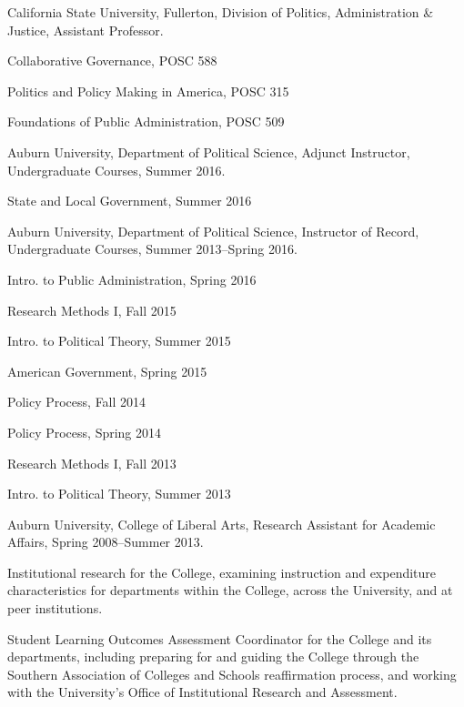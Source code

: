 \documentclass[11pt,letterpaper]{article}
\renewenvironment{itemize}{
  \begin{list}{}{
    \setlength{\leftmargin}{1.5em}
    \setlength{\itemsep}{0.25em}
    \setlength{\parskip}{0pt}
    \setlength{\parsep}{0.25em}
  }
}{
  \end{list}
}
\begin{document}
\begin{itemize}\leftmargin=2pt\itemindent=-15pt
	
\item California State University, Fullerton, Division of Politics, Administration \& Justice, Assistant Professor.
	\begin{itemize}
		\item Collaborative Governance, POSC 588
		\item Politics and Policy Making in America, POSC 315
		\item Foundations of Public Administration, POSC 509
	\end{itemize}
	
\item Auburn University, Department of Political Science, Adjunct Instructor, Undergraduate Courses, Summer 2016.
	\begin{itemize}\leftmargin=2pt\itemindent=-15pt
		\item State and Local Government, Summer 2016
	\end{itemize}
	
\item Auburn University, Department of Political Science, Instructor of Record, Undergraduate Courses, Summer 2013--Spring 2016.
  	\begin{itemize}\leftmargin=2pt\itemindent=-15pt
			\begin{multicols}{2}
			\item Intro. to Public Administration, Spring 2016
			\item Research Methods I, Fall 2015      
			\item Intro. to Political Theory, Summer 2015
			\item American Government, Spring 2015
			\item Policy Process, Fall 2014	
			\item Policy Process, Spring 2014
			\item Research Methods I, Fall 2013
			\item Intro. to Political Theory, Summer 2013
		 	\end{multicols}				
	\end{itemize}

\item Auburn University, College of Liberal Arts, Research Assistant for Academic Affairs,
  Spring 2008--Summer 2013.
  	\begin{itemize}\leftmargin=2pt\itemindent=-15pt
		\item Institutional research for the College, examining instruction and expenditure characteristics for departments within the College, across the University, and at peer institutions.   
		\item Student Learning Outcomes Assessment Coordinator for the College and its departments, including preparing for and guiding the College through the Southern Association of Colleges and Schools reaffirmation process, and working with the University's Office of Institutional Research and Assessment.
	\end{itemize}
\end{itemize}
		
\end{document}
